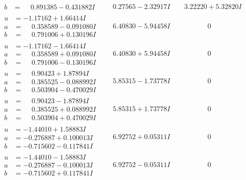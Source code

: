 \documentclass[1p]{elsarticle_modified}
\theoremstyle{definition}
\begin{document}
$$\begin{array}{c|c|c}
\begin{aligned}
b &= \phantom{-}0.891385 - 0.431882 I\end{aligned}
 & \phantom{-}0.27565 - 2.32917 I & \phantom{-}3.22220 + 5.32820 I \\ \hline\begin{aligned}
u &= -1.17162 + 1.66414 I \\
a &= \phantom{-}0.358589 - 0.091080 I \\
b &= \phantom{-}0.791006 + 0.130196 I\end{aligned}
 & \phantom{-}6.40830 - 5.94458 I & \phantom{-0.000000 } 0 \\ \hline\begin{aligned}
u &= -1.17162 - 1.66414 I \\
a &= \phantom{-}0.358589 + 0.091080 I \\
b &= \phantom{-}0.791006 - 0.130196 I\end{aligned}
 & \phantom{-}6.40830 + 5.94458 I & \phantom{-0.000000 } 0 \\ \hline\begin{aligned}
u &= \phantom{-}0.90423 + 1.87894 I \\
a &= \phantom{-}0.385525 - 0.088992 I \\
b &= \phantom{-}0.503904 - 0.470029 I\end{aligned}
 & \phantom{-}5.85315 - 1.73778 I & \phantom{-0.000000 } 0 \\ \hline\begin{aligned}
u &= \phantom{-}0.90423 - 1.87894 I \\
a &= \phantom{-}0.385525 + 0.088992 I \\
b &= \phantom{-}0.503904 + 0.470029 I\end{aligned}
 & \phantom{-}5.85315 + 1.73778 I & \phantom{-0.000000 } 0 \\ \hline\begin{aligned}
u &= -1.44010 + 1.58883 I \\
a &= -0.276887 + 0.100013 I \\
b &= -0.715602 - 0.117841 I\end{aligned}
 & \phantom{-}6.92752 + 0.05311 I & \phantom{-0.000000 } 0 \\ \hline\begin{aligned}
u &= -1.44010 - 1.58883 I \\
a &= -0.276887 - 0.100013 I \\
b &= -0.715602 + 0.117841 I\end{aligned}
 & \phantom{-}6.92752 - 0.05311 I & \phantom{-0.000000 } 0 \\ \hline\begin{aligned}

\end{aligned}
\end{array}$$
\end{document}
